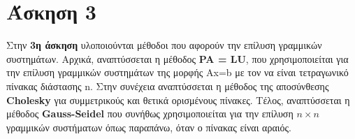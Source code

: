 \documentclass[First Project.tex]{subfiles}
\begin{document}
\section{ Άσκηση 3 }
Στην \textbf{3η άσκηση} υλοποιούνται μέθοδοι που αφορούν την επίλυση γραμμικών συστημάτων.
Αρχικά, αναπτύσσεται η μέθοδος \textbf{\textlatin{PA = LU}}, που χρησιμοποιείται για την επίλυση γραμμικών συστημάτων της μορφής 
\textlatin{Ax=b} με τον \textlatin{} να είναι τετραγωνικό πίνακας διάστασης \textlatin{n}. Στην συνέχεια αναπτύσσεται η μέθοδος της αποσύνθεσης \textlatin{\textbf{Cholesky}} για συμμετρικούς και θετικά
ορισμένους πίνακες. Τέλος, αναπτύσσεται η μέθοδος \textlatin{\textbf{Gauss-Seidel}} που συνήθως χρησιμοποιείται για την επίλυση $n \times n$ 
γραμμικών συστήματων όπως παραπάνω, όταν ο πίνακας \textlatin{} είναι αραιός. 
\end{document}
